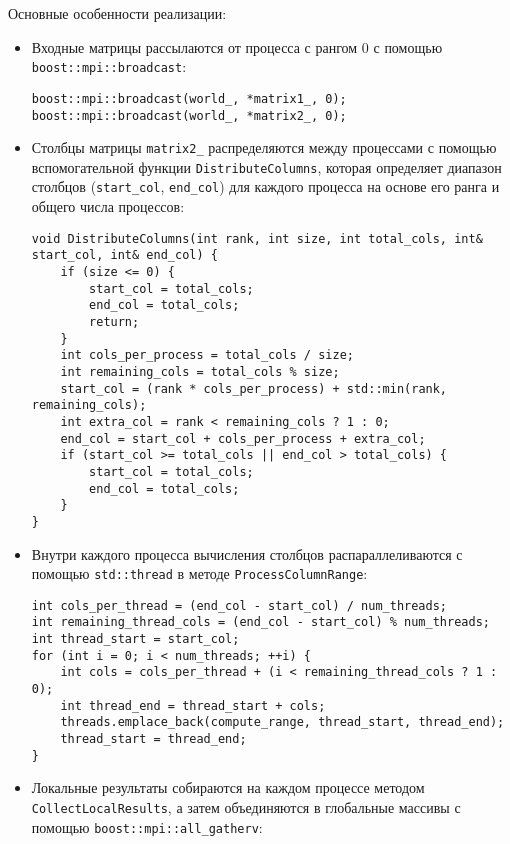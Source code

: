 \documentclass[12pt]{extarticle}
\begin{document}
Основные особенности реализации:
\begin{itemize}
    \item Входные матрицы рассылаются от процесса с рангом 0 с помощью \texttt{boost::mpi::broadcast}:
    \begin{lstlisting}[caption={Рассылка входных матриц в методе RunImpl},label={lst:mpi_broadcast}]
boost::mpi::broadcast(world_, *matrix1_, 0);
boost::mpi::broadcast(world_, *matrix2_, 0);
    \end{lstlisting}
    \item Столбцы матрицы \texttt{matrix2\_} распределяются между процессами с помощью вспомогательной функции \texttt{DistributeColumns}, которая определяет диапазон столбцов (\texttt{start\_col}, \texttt{end\_col}) для каждого процесса на основе его ранга и общего числа процессов:
    \begin{lstlisting}[caption={Распределение столбцов между процессами},label={lst:mpi_distribute}]
void DistributeColumns(int rank, int size, int total_cols, int& start_col, int& end_col) {
    if (size <= 0) {
        start_col = total_cols;
        end_col = total_cols;
        return;
    }
    int cols_per_process = total_cols / size;
    int remaining_cols = total_cols % size;
    start_col = (rank * cols_per_process) + std::min(rank, remaining_cols);
    int extra_col = rank < remaining_cols ? 1 : 0;
    end_col = start_col + cols_per_process + extra_col;
    if (start_col >= total_cols || end_col > total_cols) {
        start_col = total_cols;
        end_col = total_cols;
    }
}
    \end{lstlisting}
    \item Внутри каждого процесса вычисления столбцов распараллеливаются с помощью \texttt{std::thread} в методе \texttt{ProcessColumnRange}:
    \begin{lstlisting}[caption={Параллельная обработка столбцов внутри процесса},label={lst:mpi_stl_threads}]
int cols_per_thread = (end_col - start_col) / num_threads;
int remaining_thread_cols = (end_col - start_col) % num_threads;
int thread_start = start_col;
for (int i = 0; i < num_threads; ++i) {
    int cols = cols_per_thread + (i < remaining_thread_cols ? 1 : 0);
    int thread_end = thread_start + cols;
    threads.emplace_back(compute_range, thread_start, thread_end);
    thread_start = thread_end;
}
    \end{lstlisting}
    \item Локальные результаты собираются на каждом процессе методом \texttt{CollectLocalResults}, а затем объединяются в глобальные массивы с помощью \texttt{boost::mpi::all\_gatherv}:

\end{itemize}
\end{document}
